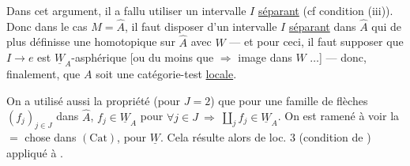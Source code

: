 
Dans cet argument, il a fallu  utiliser un intervalle
$I$ \uline{séparant} (cf condition (iii)). Donc dans le cas $M=\widehat A$, il faut
disposer d'un intervalle $I$ \uline{séparant} dans $\widehat A$
 qui de plus définisse une 
homotopique sur $\widehat A$  avec $W$
--- et pour ceci, il faut supposer que
$I\longrightarrow e$ est $\underline W_A$-asphérique
[ou du moins que 
 
$\Rightarrow$ image dans $W$ $\ldots$] --- donc, finalement, que
 $A$ soit une catégorie-test \uline{locale}.

On a utilisé aussi la propriété (pour  $J=2$) que pour une famille de
flèches $(f_j)_{j\in J}$ dans $\widehat A$, $f_j\in\underline W_A$ pour
$\forall j\in J\ \Longrightarrow\ \coprod_j f_j\in\underline W_A$.
On est ramené à voir la $=$ chose dans $(\mathrm{Cat})$, pour $\underline W$.
Cela résulte alors de loc. 3 (condition de ) appliqué à
.

